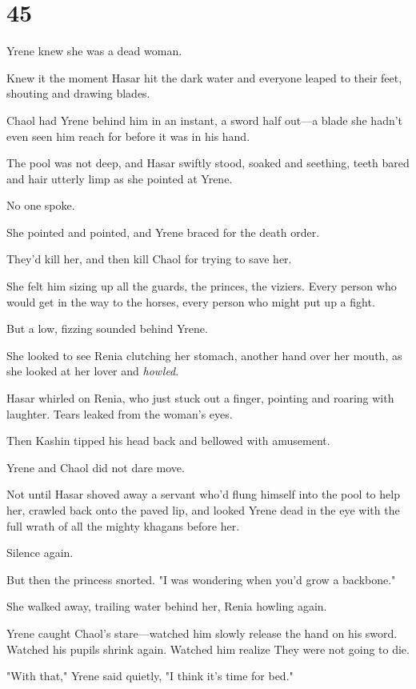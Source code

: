 
\chapter{45}

Yrene knew she was a dead woman.

Knew it the moment Hasar hit the dark water and everyone leaped to their feet, shouting and drawing blades.

Chaol had Yrene behind him in an instant, a sword half out---a blade she hadn't even seen him reach for before it was in his hand.

The pool was not deep, and Hasar swiftly stood, soaked and seething, teeth bared and hair utterly limp as she pointed at Yrene.

No one spoke.

She pointed and pointed, and Yrene braced for the death order.

They'd kill her, and then kill Chaol for trying to save her.

She felt him sizing up all the guards, the princes, the viziers.
Every person who would get in the way to the horses, every person who might put up a fight.

But a low, fizzing sounded behind Yrene.

She looked to see Renia clutching her stomach, another hand over her mouth, as she looked at her lover and \emph{howled}.

Hasar whirled on Renia, who just stuck out a finger, pointing and roaring with laughter.
Tears leaked from the woman's eyes.

Then Kashin tipped his head back and bellowed with amusement.

Yrene and Chaol did not dare move.

Not until Hasar shoved away a servant who'd flung himself into the pool to help her, crawled back onto the paved lip, and looked Yrene dead in the eye with the full wrath of all the mighty khagans before her.

Silence again.

But then the princess snorted.
"I was wondering when you'd grow a backbone."

She walked away, trailing water behind her, Renia howling again.

Yrene caught Chaol's stare---watched him slowly release the hand on his sword.
Watched his pupils shrink again.
Watched him realize 
They were not going to die.

"With that," Yrene said quietly, "I think it's time for bed."

